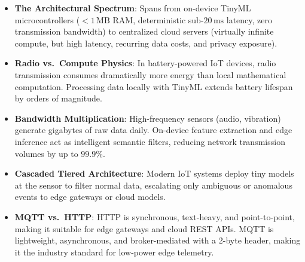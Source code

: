 \begin{takeaways}
\begin{itemize}
    \item \textbf{The Architectural Spectrum}: Spans from on-device TinyML microcontrollers ($< 1\,\text{MB}$ RAM, deterministic sub-$20\,\text{ms}$ latency, zero transmission bandwidth) to centralized cloud servers (virtually infinite compute, but high latency, recurring data costs, and privacy exposure).
    \item \textbf{Radio vs.\ Compute Physics}: In battery-powered IoT devices, radio transmission consumes dramatically more energy than local mathematical computation. Processing data locally with TinyML extends battery lifespan by orders of magnitude.
    \item \textbf{Bandwidth Multiplication}: High-frequency sensors (audio, vibration) generate gigabytes of raw data daily. On-device feature extraction and edge inference act as intelligent semantic filters, reducing network transmission volumes by up to $99.9\%$.
    \item \textbf{Cascaded Tiered Architecture}: Modern IoT systems deploy tiny models at the sensor to filter normal data, escalating only ambiguous or anomalous events to edge gateways or cloud models.
    \item \textbf{MQTT vs.\ HTTP}: HTTP is synchronous, text-heavy, and point-to-point, making it suitable for edge gateways and cloud REST APIs. MQTT is lightweight, asynchronous, and broker-mediated with a 2-byte header, making it the industry standard for low-power edge telemetry.
\end{itemize}
\end{takeaways}

